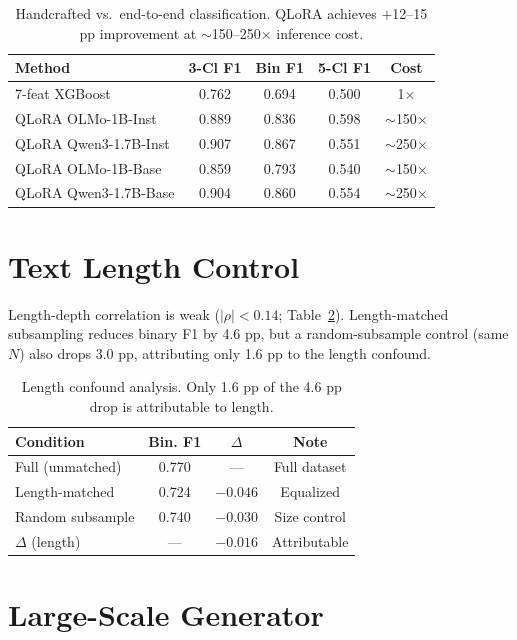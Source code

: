 \documentclass[11pt,a4paper]{article}
\begin{document}
\begin{table}[h]
\centering
\small
\begin{tabular}{lcccc}
\toprule
\textbf{Method} & \textbf{3-Cl F1} & \textbf{Bin F1} & \textbf{5-Cl F1} & \textbf{Cost} \\
\midrule
7-feat XGBoost & 0.762 & 0.694 & 0.500 & 1$\times$ \\
QLoRA OLMo-1B-Inst & 0.889 & 0.836 & 0.598 & $\sim$150$\times$ \\
QLoRA Qwen3-1.7B-Inst & 0.907 & 0.867 & 0.551 & $\sim$250$\times$ \\
QLoRA OLMo-1B-Base & 0.859 & 0.793 & 0.540 & $\sim$150$\times$ \\
QLoRA Qwen3-1.7B-Base & 0.904 & 0.860 & 0.554 & $\sim$250$\times$ \\
\bottomrule
\end{tabular}
\caption{Handcrafted vs.\ end-to-end classification. QLoRA achieves $+$12--15 pp improvement at $\sim$150--250$\times$ inference cost.}
\label{tab:qlora_app}
\end{table}

\section{Text Length Control}
\label{app:length}

Length-depth correlation is weak ($|\rho| < 0.14$; Table~\ref{tab:length}).
Length-matched subsampling reduces binary F1 by 4.6 pp, but a random-subsample control (same $N$) also drops 3.0 pp, attributing only 1.6 pp to the length confound.

\begin{table}[h]
\centering
\small
\begin{tabular}{lccc}
\toprule
\textbf{Condition} & \textbf{Bin. F1} & \textbf{$\Delta$} & \textbf{Note} \\
\midrule
Full (unmatched) & 0.770 & — & Full dataset \\
Length-matched & 0.724 & $-0.046$ & Equalized \\
Random subsample & 0.740 & $-0.030$ & Size control \\
$\Delta$ (length) & — & $-0.016$ & Attributable \\
\bottomrule
\end{tabular}
\caption{Length confound analysis. Only 1.6 pp of the 4.6 pp drop is attributable to length.}
\label{tab:length}
\end{table}

\section{Large-Scale Generator}
\label{app:scale}
\end{document}
